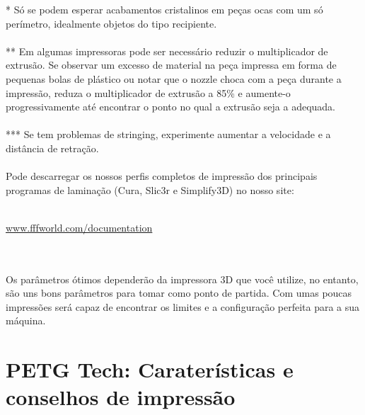 \documentclass[11pt,a4paper]{article}
\begin{document}
* Só se podem esperar acabamentos cristalinos em peças ocas com um só perímetro, idealmente objetos do tipo recipiente.\\\\
** Em algumas impressoras pode ser necessário reduzir o multiplicador de extrusão. Se observar um excesso de material na peça impressa em forma de pequenas bolas de plástico ou notar que o nozzle choca com a peça durante a impressão, reduza o multiplicador de extrusão a 85\% e aumente-o progressivamente até encontrar o ponto no qual a extrusão seja a adequada.\\\\
*** Se tem problemas de stringing, experimente aumentar a velocidade e a distância de retração.\\\\
Pode descarregar os nossos perfis completos de impressão dos principais programas de laminação (Cura, Slic3r e Simplify3D) no nosso site:
\\\\
\centerline{ {\huge \url{www.fffworld.com/documentation} } }
\\\\
Os parâmetros ótimos dependerão da impressora 3D que você utilize, no entanto, são uns bons parâmetros para tomar como ponto de partida. Com umas poucas impressões será capaz de encontrar os limites e a configuração perfeita para a sua máquina.
\section{PETG Tech: Caraterísticas e conselhos de impressão}
\end{document}
